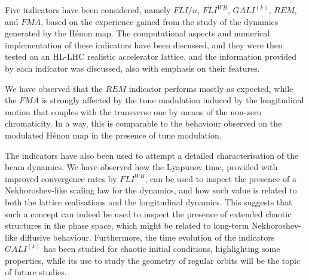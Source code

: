 
Five indicators have been considered, namely $FLI/n$, $FLI^{WB}$, $GALI^{(k)}$, $REM$, and $FMA$, based on the experience gained from the study of the dynamics generated by the H\'enon map. The computational aspects and numerical implementation of these indicators have been discussed, and they were then tested on an HL-LHC realistic accelerator lattice, and the information provided by each indicator was discussed, also with emphasis on their features.

We have observed that the $REM$ indicator performs mostly as expected, while the $FMA$ is strongly affected by the tune modulation induced by the longitudinal motion that couples with the transverse one by means of the non-zero chromaticity. In a way, this is comparable to the behaviour observed on the modulated Hénon map in the presence of tune modulation. 

The indicators have also been used to attempt a detailed characterisation of the beam dynamics. We have observed how the Lyapunov time, provided with improved convergence rates by $FLI^{WB}$, can be used to inspect the presence of a Nekhoroshev-like scaling law for the dynamics, and how such value is related to both the lattice realisations and the longitudinal dynamics. This suggests that such a concept can indeed be used to inspect the presence of extended chaotic structures in the phase space, which might be related to long-term Nekhoroshev-like diffusive behaviour. Furthermore, the time evolution of the indicators $GALI^{(k)}$ has been studied for chaotic initial conditions, highlighting some properties, while its use to study the geometry of regular orbits will be the topic of future studies.
